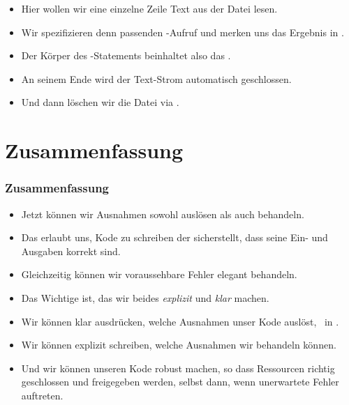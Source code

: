 \documentclass[aspectratio=169,mathserif,notheorems]{beamer}%
\begin{document}
\begin{frame}[t]
{{\begin{itemize}
{}%
%
%
%
%
%
%
%
\item<19-> Hier wollen wir eine einzelne Zeile Text aus der Datei lesen.%
%
\item<20-> Wir spezifizieren denn passenden -Aufruf und merken uns das Ergebnis in .%
%
\item<21-> Der Körper des -Statements beinhaltet also das .%
%
\item<22-> An seinem Ende wird der Text-Strom automatisch geschlossen.%
%
\item<23-> Und dann löschen wir die Datei via .%
\end{itemize}%
}}%
%
%
%
%
%
\end{frame}%
%
\section{Zusammenfassung}%
%
\begin{frame}%
\frametitle{Zusammenfassung}%
\begin{itemize}%
%
\item Jetzt können wir Ausnahmen sowohl auslösen als auch behandeln.%
%
\item<2-> Das erlaubt uns, Kode zu schreiben der sicherstellt, dass seine Ein- und Ausgaben korrekt sind.%
%
\item<3-> Gleichzeitig können wir voraussehbare Fehler elegant behandeln.%
%
\item<4-> Das Wichtige ist, das wir beides \emph{explizit} und \emph{klar} machen.%
%
\item<5-> Wir können klar ausdrücken, welche Ausnahmen unser Kode auslöst, \DEzB\ in .%
%
\item<6-> Wir können explizit schreiben, welche Ausnahmen wir behandeln können.%
%
\item<7-> Und wir können unseren Kode robust machen, so dass Ressourcen richtig geschlossen und freigegeben werden, selbst dann, wenn unerwartete Fehler auftreten.%
%
\end{itemize}%
\end{frame}%
%
\endPresentation%
\end{document}
